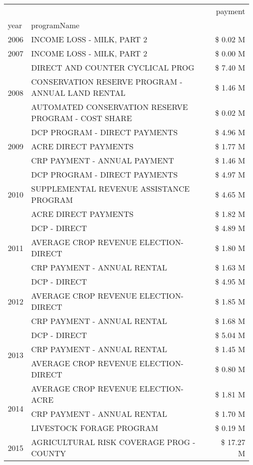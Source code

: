 \begin{tabular}{llr}
\toprule
 &  & payment \\
year & programName &  \\
\midrule
2006 & INCOME LOSS - MILK, PART 2 & \$ 0.02 M \\
\cline{1-3}
2007 & INCOME LOSS - MILK, PART 2 & \$ 0.00 M \\
\cline{1-3}
\multirow[t]{3}{*}{2008} & DIRECT AND COUNTER CYCLICAL PROG & \$ 7.40 M \\
 & CONSERVATION RESERVE PROGRAM - ANNUAL LAND RENTAL & \$ 1.46 M \\
 & AUTOMATED CONSERVATION RESERVE PROGRAM - COST SHARE & \$ 0.02 M \\
\cline{1-3}
\multirow[t]{3}{*}{2009} & DCP PROGRAM - DIRECT PAYMENTS & \$ 4.96 M \\
 & ACRE DIRECT PAYMENTS & \$ 1.77 M \\
 & CRP PAYMENT - ANNUAL PAYMENT & \$ 1.46 M \\
\cline{1-3}
\multirow[t]{3}{*}{2010} & DCP PROGRAM - DIRECT PAYMENTS & \$ 4.97 M \\
 & SUPPLEMENTAL REVENUE ASSISTANCE PROGRAM & \$ 4.65 M \\
 & ACRE DIRECT PAYMENTS & \$ 1.82 M \\
\cline{1-3}
\multirow[t]{3}{*}{2011} & DCP - DIRECT & \$ 4.89 M \\
 & AVERAGE CROP REVENUE ELECTION-DIRECT & \$ 1.80 M \\
 & CRP PAYMENT - ANNUAL RENTAL & \$ 1.63 M \\
\cline{1-3}
\multirow[t]{3}{*}{2012} & DCP - DIRECT & \$ 4.95 M \\
 & AVERAGE CROP REVENUE ELECTION-DIRECT & \$ 1.85 M \\
 & CRP PAYMENT - ANNUAL RENTAL & \$ 1.68 M \\
\cline{1-3}
\multirow[t]{3}{*}{2013} & DCP - DIRECT & \$ 5.04 M \\
 & CRP PAYMENT - ANNUAL RENTAL & \$ 1.45 M \\
 & AVERAGE CROP REVENUE ELECTION-DIRECT & \$ 0.80 M \\
\cline{1-3}
\multirow[t]{3}{*}{2014} & AVERAGE CROP REVENUE ELECTION-ACRE & \$ 1.81 M \\
 & CRP PAYMENT - ANNUAL RENTAL & \$ 1.70 M \\
 & LIVESTOCK FORAGE PROGRAM & \$ 0.19 M \\
\cline{1-3}
\multirow[t]{3}{*}{2015} & AGRICULTURAL RISK COVERAGE PROG - COUNTY & \$ 17.27 M \\

\end{tabular}
